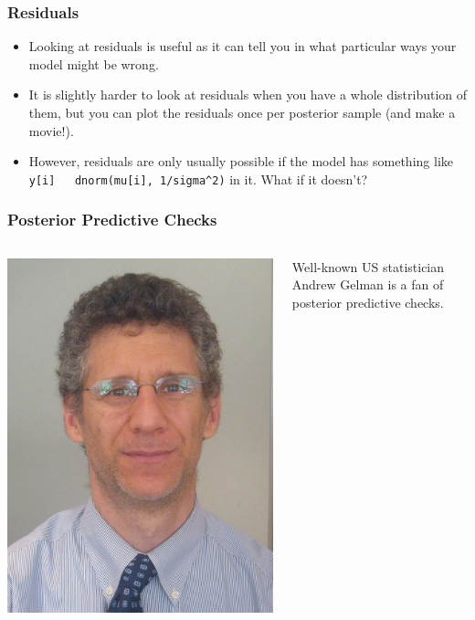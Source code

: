\documentclass{beamer}
\begin{document}
\begin{frame}[fragile]
\frametitle{Residuals}

\begin{itemize}
\item Looking at residuals is useful as it can tell you in what particular ways
your model might be wrong.\pause
\item It is slightly harder to look at residuals when you have a whole
distribution of them, but you can plot the residuals once per posterior sample
(and make a movie!).\pause
\item However, residuals are only usually possible if the model has something like
\texttt{y[i] ~ dnorm(mu[i], 1/sigma^2)} in it. What if it doesn't?
\end{itemize}

\end{frame}


\begin{frame}
\frametitle{Posterior Predictive Checks}

    \begin{columns} %
        \includegraphics[width=0.8\linewidth]{images/gelman.jpg}

        Well-known US statistician Andrew Gelman is a fan of posterior
        predictive checks.
     \end{columns}

\end{frame}
\end{document}
